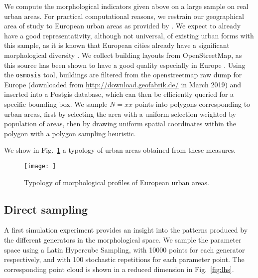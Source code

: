 \documentclass[letterpaper]{article}
\begin{document}
We compute the morphological indicators given above on a large sample on real urban areas. For practical computational reasons, we restrain our geographical area of study to European urban areas as provided by \cite{}. We expect to already have a good representativity, although not universal, of existing urban forms with this sample, as it is known that European cities already have a significant morphological diversity \citep{le2015forme}. We collect building layouts from OpenStreetMap, as this source has been shown to have a good quality especially in Europe \citep{mooney2010towards}. Using the \texttt{osmosis} tool, buildings are filtered from the openstreetmap raw dump for Europe (downloaded from \url{http://download.geofabrik.de/} in March 2019) and inserted into a Postgis database, which can then be efficiently queried for a specific bounding box.
We sample $N=xx$ points into polygons corresponding to urban areas, first by selecting the area with a uniform selection weighted by population of areas, then by drawing uniform spatial coordinates within the polygon with a polygon sampling heuristic. %





We show in Fig.~\ref{fig:realtypology} a typology of urban areas obtained from these measures.

\begin{figure}
    \centering
    \texttt{[image: ]}
    \caption{Typology of morphological profiles of European urban areas.}
    \label{fig:realtypology}
\end{figure}




\subsection{Direct sampling}

A first simulation experiment provides an insight into the patterns produced by the different generators in the morphological space. We sample the parameter space using a Latin Hypercube Sampling, with 10000 points for each generator respectively, and with 100 stochastic repetitions for each parameter point. The corresponding point cloud is shown in a reduced dimension in Fig.~\ref{fig:lhs}.
\end{document}
